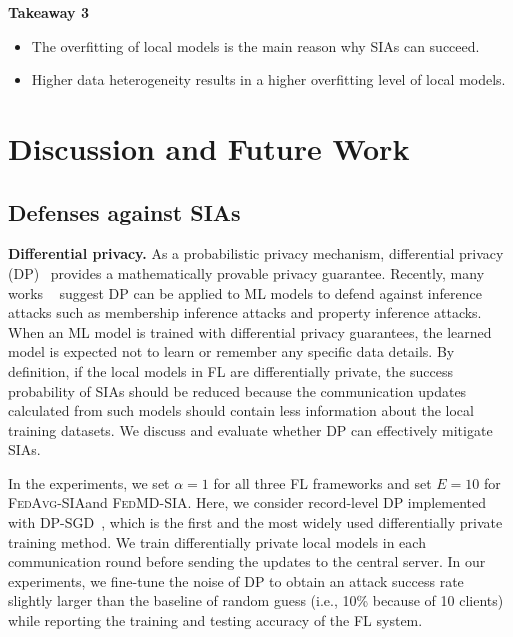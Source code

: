 \documentclass[10pt,journal,compsoc]{IEEEtran}
\newcommand*\fedavg{\textsc{FedAvg-SIA}}
\newcommand*\fedmd{\textsc{FedMD-SIA}}
\begin{document}
\begin{mdframed}[backgroundcolor=white!10,rightline=true,leftline=true,topline=true,bottomline=true,roundcorner=2mm,everyline=true]
\textbf{Takeaway 3~}
\begin{itemize}
    \item The overfitting of local models is the main reason why SIAs can succeed.
    \item Higher data heterogeneity results in a higher overfitting level of local models.
\end{itemize}

\end{mdframed}

\section{Discussion and Future Work}\label{sec::05}
\subsection{Defenses against SIAs}
\noindent \textbf{Differential privacy. \;} As a probabilistic privacy mechanism, differential privacy (DP)~\cite{dwork2006calibrating} provides a mathematically provable privacy guarantee. Recently, many works ~\cite{shokri2015privacy,geyer2017differentially,mcmahan2018learning,naseri2020toward,rahman2018membership} suggest DP can be applied to ML models to defend against inference attacks such as membership inference attacks and property inference attacks. When an ML model is trained with differential privacy guarantees, the learned model is expected not to learn or remember any specific data details. By definition, if the local models in FL are differentially private, the success probability of SIAs should be reduced because the communication updates calculated from such models should contain less information about the local training datasets. We discuss and evaluate whether DP can effectively mitigate SIAs.

In the experiments, we set $\alpha=1$ for all three FL frameworks and set $E=10$ for \fedavg \;and \fedmd. Here, we consider record-level DP implemented with DP-SGD~\cite{abadi2016deep}, which is the first and the most widely used differentially private training method. We train differentially private local models in each communication round before sending the updates to the central server. In our experiments, we fine-tune the noise of DP to obtain an attack success rate slightly larger than the baseline of random guess (i.e., 10\% because of 10 clients) while reporting the training and testing accuracy of the FL system.
\end{document}
